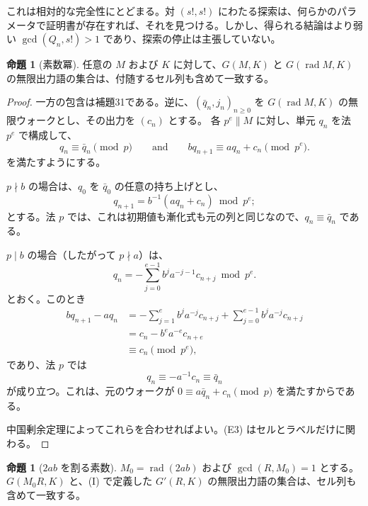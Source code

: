 \documentclass[11pt,reqno]{amsart}
\theoremstyle{definition}
\newtheorem{proposition}[theorem]{命題}
\theoremstyle{definition}
\theoremstyle{remark}
\begin{document}
これは相対的な完全性にとどまる。対 \((s!,s!)\) にわたる探索は、何らかのパラメータで証明書が存在すれば、それを見つける。しかし、得られる結論はより弱い \(\gcd(Q_n,s!)>1\) であり、探索の停止は主張していない。

\begin{samepage}
\begin{proposition}[素数冪]\leavevmode\label{thm:35}
任意の \(M\) および \(K\) に対して、\(G(M,K)\) と \(G(\operatorname{rad}M,K)\) の無限出力語の集合は、付随するセル列も含めて一致する。
\label{thm-end:35}
\end{proposition}
\end{samepage}

\begin{proof}\leavevmode\label{proof:35}
一方の包含は補題31である。逆に、\((\bar q_n,j_n)_{n\ge0}\) を \(G(\operatorname{rad}M,K)\) の無限ウォークとし、その出力を \((c_n)\) とする。
各 \(p^e\parallel M\) に対し、単元 \(q_n\) を法 \(p^e\) で構成して、
\[
q_n\equiv\bar q_n\pmod p\qquad \text{and}\qquad bq_{n+1}\equiv aq_n+c_n\pmod{p^e}.
\]
を満たすようにする。

\(p\nmid b\) の場合は、\(q_0\) を \(\bar q_0\) の任意の持ち上げとし、
\[
q_{n+1}=b^{-1}(aq_n+c_n)\bmod p^e;
\]
とする。法 \(p\) では、これは初期値も漸化式も元の列と同じなので、\(q_n\equiv\bar q_n\) である。

\(p\mid b\) の場合（したがって \(p\nmid a\)）は、
\[
q_n=-\sum_{j=0}^{e-1}b^ja^{-j-1}c_{n+j}\bmod p^e.
\]
とおく。このとき
\[
\begin{aligned}
bq_{n+1}-aq_n&=-\sum_{j=1}^{e}b^ja^{-j}c_{n+j}+\sum_{j=0}^{e-1}b^ja^{-j}c_{n+j}\\
&=c_n-b^ea^{-e}c_{n+e}\\
&\equiv c_n\pmod{p^e},
\end{aligned}
\]
であり、法 \(p\) では
\[
q_n\equiv-a^{-1}c_n\equiv\bar q_n
\]
が成り立つ。これは、元のウォークが \(0\equiv a\bar q_n+c_n\pmod p\) を満たすからである。

中国剰余定理によってこれらを合わせればよい。(E3) はセルとラベルだけに関わる。\qedhere
\end{proof}

\begin{samepage}
\begin{proposition}[\(2ab\) を割る素数]\leavevmode\label{thm:36}
\(M_0=\operatorname{rad}(2ab)\) および \(\gcd(R,M_0)=1\) とする。\(G(M_0R,K)\) と、(I) で定義した \(G'(R,K)\) の無限出力語の集合は、セル列も含めて一致する。
\label{thm-end:36}
\end{proposition}
\end{samepage}
\end{document}
